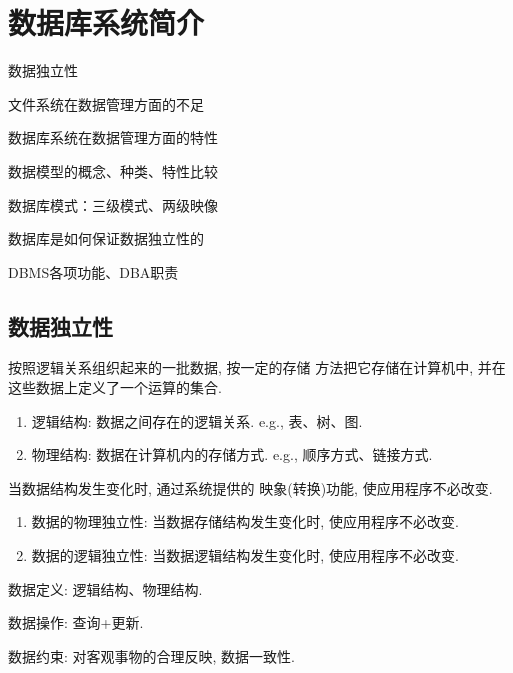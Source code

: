 \chapter{数据库系统简介}

\begin{introduction}[期末考试提纲]
    \item 数据独立性
    \item 文件系统在数据管理方面的不足
    \item 数据库系统在数据管理方面的特性
    \item 数据模型的概念、种类、特性比较
    \item 数据库模式：三级模式、两级映像

    \item 数据库是如何保证数据独立性的
    \item DBMS各项功能、DBA职责
\end{introduction}

\section{数据独立性}

\begin{definition}[数据结构]
按照逻辑关系组织起来的一批数据, 按一定的存储
方法把它存储在计算机中,
并在这些数据上定义了一个运算的集合.

\begin{enumerate}
    \item 逻辑结构: 数据之间存在的逻辑关系. e.g., 表、树、图.
    \item 物理结构: 数据在计算机内的存储方式. e.g., 顺序方式、链接方式.
\end{enumerate}
\end{definition}

\begin{definition}[数据独立性]
当数据结构发生变化时, 通过系统提供的
映象(转换)功能, 使应用程序不必改变.

\begin{enumerate}
    \item 数据的物理独立性: 当数据存储结构发生变化时, 使应用程序不必改变.
    \item 数据的逻辑独立性: 当数据逻辑结构发生变化时, 使应用程序不必改变.
\end{enumerate}
\end{definition}


数据定义: 逻辑结构、物理结构.

数据操作: 查询+更新.

数据约束: 对客观事物的合理反映, 数据一致性.

